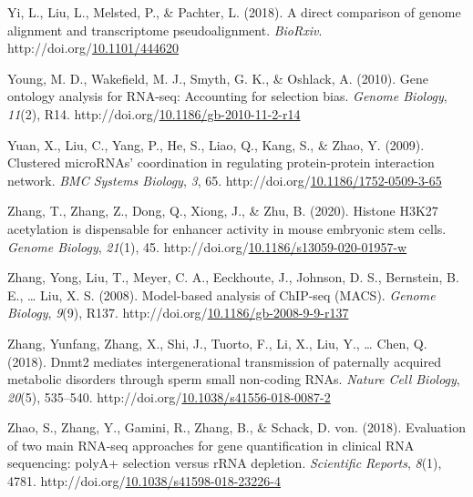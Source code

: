 \documentclass[12pt,twoside]{reedthesis}
\newlength{\cslhangindent}
\newenvironment{CSLReferences}[2] %
 {%
  \setlength{\parindent}{0pt}
  \ifodd #1 \everypar{\setlength{\hangindent}{\cslhangindent}}\ignorespaces\fi
  \ifnum #2 > 0
  \setlength{\parskip}{#2\baselineskip}
  \fi
 }%
 {}
\begin{document}
\begin{CSLReferences}{1}{0}
\leavevmode{}%
Yi, L., Liu, L., Melsted, P., \& Pachter, L. (2018). A direct comparison of genome alignment and transcriptome pseudoalignment. \emph{BioRxiv}. http://doi.org/\href{https://doi.org/10.1101/444620}{10.1101/444620}

\leavevmode{}%
Young, M. D., Wakefield, M. J., Smyth, G. K., \& Oshlack, A. (2010). Gene ontology analysis for RNA-seq: Accounting for selection bias. \emph{Genome Biology}, \emph{11}(2), R14. http://doi.org/\href{https://doi.org/10.1186/gb-2010-11-2-r14}{10.1186/gb-2010-11-2-r14}

\leavevmode{}%
Yuan, X., Liu, C., Yang, P., He, S., Liao, Q., Kang, S., \& Zhao, Y. (2009). Clustered microRNAs' coordination in regulating protein-protein interaction network. \emph{BMC Systems Biology}, \emph{3}, 65. http://doi.org/\href{https://doi.org/10.1186/1752-0509-3-65}{10.1186/1752-0509-3-65}

\leavevmode{}%
Zhang, T., Zhang, Z., Dong, Q., Xiong, J., \& Zhu, B. (2020). Histone H3K27 acetylation is dispensable for enhancer activity in mouse embryonic stem cells. \emph{Genome Biology}, \emph{21}(1), 45. http://doi.org/\href{https://doi.org/10.1186/s13059-020-01957-w}{10.1186/s13059-020-01957-w}

\leavevmode{}%
Zhang, Yong, Liu, T., Meyer, C. A., Eeckhoute, J., Johnson, D. S., Bernstein, B. E., \ldots{} Liu, X. S. (2008). Model-based analysis of ChIP-seq (MACS). \emph{Genome Biology}, \emph{9}(9), R137. http://doi.org/\href{https://doi.org/10.1186/gb-2008-9-9-r137}{10.1186/gb-2008-9-9-r137}

\leavevmode{}%
Zhang, Yunfang, Zhang, X., Shi, J., Tuorto, F., Li, X., Liu, Y., \ldots{} Chen, Q. (2018). Dnmt2 mediates intergenerational transmission of paternally acquired metabolic disorders through sperm small non-coding {RNAs}. \emph{Nature Cell Biology}, \emph{20}(5), 535--540. http://doi.org/\href{https://doi.org/10.1038/s41556-018-0087-2}{10.1038/s41556-018-0087-2}

\leavevmode{}%
Zhao, S., Zhang, Y., Gamini, R., Zhang, B., \& Schack, D. von. (2018). Evaluation of two main {RNA}-seq approaches for gene quantification in clinical {RNA} sequencing: {polyA}+ selection versus {rRNA} depletion. \emph{Scientific Reports}, \emph{8}(1), 4781. http://doi.org/\href{https://doi.org/10.1038/s41598-018-23226-4}{10.1038/s41598-018-23226-4}


\end{CSLReferences}
\end{document}
